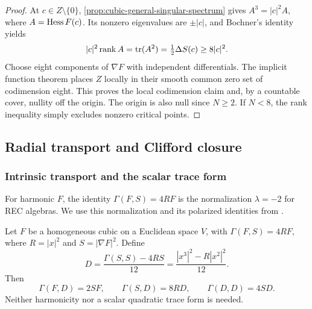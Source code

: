 \begin{proof}
At \(c\in Z\setminus\{0\}\),
\cref{prop:cubic-general-singular-spectrum} gives
\(A^3=|c|^2A\), where \(A=\operatorname{Hess} F(c)\). Its nonzero eigenvalues
are \(\pm|c|\), and Bochner's identity yields
\[
 |c|^2\operatorname{rank}A=\operatorname{tr}(A^2)
   =\tfrac12\Delta S(c)\ge8|c|^2.
\]
Choose eight components of \(\nabla F\) with independent differentials.
The implicit function theorem places \(Z\) locally in their smooth
common zero set of codimension eight. This proves the local codimension
claim and, by a countable cover, nullity off the origin. The origin is
also null since \(N\ge2\).
If \(N<8\), the rank inequality simply excludes nonzero critical points.
\end{proof}

\subsection{Radial transport and Clifford closure}
\subsubsection{Intrinsic transport and the scalar trace form}

For harmonic \(F\), the identity \(\Gamma(F,S)=4RF\) is the
normalization \(\lambda=-2\) for REC algebras. We use this normalization
and its polarized identities from
\cite[Section~6.7.1, equations~(6.7.6)--(6.7.7)]{NadirashviliTkachevVladut14}.

\begin{lemma}
\label{lem:cubic-radial-transports}
Let \(F\) be a homogeneous cubic on a Euclidean space \(V\), with
\(\Gamma(F,S)=4RF\), where \(R=|x|^2\) and \(S=|\nabla F|^2\).
Define
\begin{equation}\label{eq:cubic-unified-D}
 D=\frac{\Gamma(S,S)-4RS}{12}
   =\frac{|x^3|^2-R|x^2|^2}{12}.
\end{equation}
Then
\begin{equation}\label{eq:cubic-unified-table}
 \Gamma(F,D)=2SF,\qquad
 \Gamma(S,D)=8RD,\qquad
 \Gamma(D,D)=4SD.
\end{equation}
Neither harmonicity nor a scalar quadratic trace form is needed.
\end{lemma}

